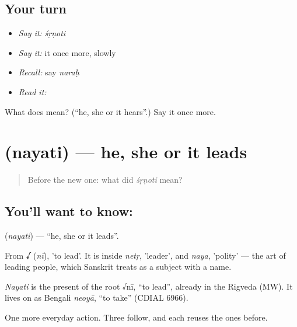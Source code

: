 \subsection*{Your turn}
\begin{itemize}
\raggedright
  \item \emph{Say it:} \emph{śṛṇoti}
  \item \emph{Say it:} it once more, slowly
  \item \emph{Recall:} say \emph{naraḥ}
  \item \emph{Read it:} \textbf{}
\end{itemize}

\begin{tcolorbox}[breakable,colback=teal!4,colframe=teal!35!black,title={Before you move on}]
What does  mean? (\textquotedblleft{}he, she or it hears\textquotedblright{}.) Say it once more.
\end{tcolorbox}
\section[\texorpdfstring{\sk{नयति} (nayati)}{नयति (nayati)}]{ (nayati) — he, she or it leads}

\label{lesson:SA-C22-lead}



\begin{quote}
Before the new one: what did \emph{śṛṇoti} mean?
\end{quote}

\subsection*{You'll want to know: }
\textbf{} (\emph{nayati}) — \textquotedblleft{}he, she or it leads\textquotedblright{}.

From \textbf{√} (\emph{nī}), 'to lead'. It is inside \emph{netṛ}, 'leader', and \emph{naya}, 'polity' — the art of leading people, which Sanskrit treats as a subject with a name.

\begin{cousinweb}
\emph{Nayati} is the present of the root √nī, \textquotedblleft{}to lead\textquotedblright{}, already in the Rigveda (MW). It lives on as Bengali \emph{neoyā}, \textquotedblleft{}to take\textquotedblright{} (CDIAL 6966).
\end{cousinweb}

\begin{grammarlens}[title={What you've built}]
One more everyday action. Three follow, and each reuses the ones before.
\end{grammarlens}

